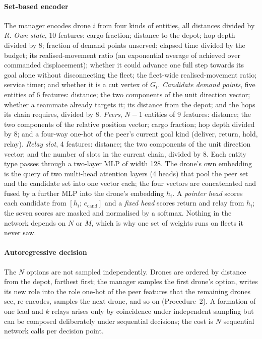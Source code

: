 \documentclass[final,5p,times,twocolumn]{elsarticle}
\begin{document}
\paragraph{Set-based encoder}
The manager encodes drone $i$ from four kinds of entities, all distances divided by $R$.
\emph{Own state}, 10 features: cargo fraction; distance to the depot; hop depth divided by 8;
fraction of demand points unserved; elapsed time divided by the budget; its realised-movement
ratio (an exponential average of achieved over commanded displacement); whether it could advance
one full step towards its goal alone without disconnecting the fleet; the fleet-wide
realised-movement ratio; service timer; and whether it is a cut vertex of $G_t$.
\emph{Candidate demand points}, five entities of 6 features: distance; the two components of the
unit direction vector; whether a teammate already targets it; its distance from the depot; and
the hops its chain requires, divided by 8. \emph{Peers}, $N-1$ entities of 9 features: distance;
the two components of the relative position vector; cargo fraction; hop depth divided by 8; and a
four-way one-hot of the peer's current goal kind (deliver, return, hold, relay). \emph{Relay
slot}, 4 features: distance; the two components of the unit direction vector; and the number of
slots in the current chain, divided by 8. Each entity type passes through a two-layer MLP of width 128. The drone's own embedding is
the query of two multi-head attention layers (4 heads) that pool the peer set and the candidate
set into one vector each; the four vectors are concatenated and fused by a further MLP into the
drone's embedding $h_i$. A \emph{pointer head} scores each candidate from $[h_i;\, e_{\mathrm{cand}}]$
and a \emph{fixed head} scores return and relay from $h_i$; the seven scores are masked and
normalised by a softmax. Nothing in the network depends on $N$ or $M$, which is why one set of
weights runs on fleets it never saw.

\paragraph{Autoregressive decision}
The $N$ options are not sampled independently. Drones are ordered by distance from the depot,
farthest first; the manager samples the first drone's option, writes its new role into the
role one-hot of the peer features that the remaining drones see, re-encodes, samples the next
drone, and so on (Procedure~2). A formation of one lead and $k$ relays arises
only by coincidence under independent sampling but can be composed deliberately under sequential
decisions; the cost is $N$ sequential network calls per decision point.
\end{document}
